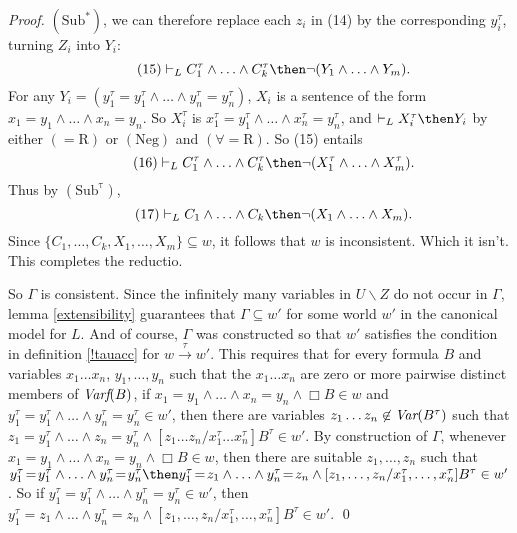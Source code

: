 \documentclass[11pt]{woarticle}
\theoremstyle{break}
\theoremstyle{nonumberplain}
\newcommand{\1}{\;\,|\;\,}
\newcommand{\var}{\emph{Var}}
\newcommand{\fvar}{\emph{Varf}}
\newcommand{\T}[1]{\ensuremath{(\mathrm{ #1})}}
\begin{document}
\begin{proof}
  \T{Sub^*}, we can therefore replace each $z_i$ in (14) by the
  corresponding $y_i^\tau$, turning $Z_i$ into $Y_i$:
  \begin{equation}\tag{15}
   \vdash_L C_1^\tau \land \ldots \land C_k^\tau \then \neg 
   (Y_1 \land\ldots\land Y_m).
  \end{equation}
  For any $Y_i = (y_1^\tau\!=\!y_1^\tau \land \ldots \land
  y_n^\tau\!=\!y_n^\tau)$, $X_i$ is a sentence of the form
  $x_1\!=\!y_1 \land \ldots \land x_n\!=\!y_n$. So $X_i^\tau$ is
  $x_1^\tau\!=\!y_1^\tau \land \ldots \land x_n^\tau\!=\!y_n^\tau$,
  and $\vdash_L X_i^\tau \then Y_i$ by either \T{=\!R} or \T{Neg} and
  \T{\forall\!=\!R}. So (15) entails
  \begin{equation}\tag{16}
    \vdash_L C_1^\tau \land \ldots \land C_k^\tau \then \neg 
    (X_1^\tau \land\ldots\land X_m^\tau).
  \end{equation}
  Thus by \T{Sub^\tau}, 
  \begin{equation}\tag{17}
    \vdash_L C_1 \land \ldots \land C_k \then \neg 
    (X_1 \land\ldots\land X_m).
  \end{equation}
  Since $\{ C_1,\ldots,C_k, X_1,\ldots,X_m \} \subseteq w$, it follows
  that $w$ is inconsistent. Which it isn't. This completes the
  reductio. 

  So $\Gamma$ is consistent. Since the infinitely many variables in
  $U\backslash Z$ do not occur in $\Gamma$, lemma \ref{extensibility}
  guarantees that $\Gamma \subseteq w'$ for some world $w'$ in the
  canonical model for $L$. And of course, $\Gamma$ was constructed so
  that $w'$ satisfies the condition in definition \ref{!tauacc} for
  $w\xrightarrow{\tau}w'$. This requires that for every formula $B$
  and variables $x_1\ldots x_n$, $y_1,\ldots,y_n$ such that the
  $x_1\ldots x_n$ are zero or more pairwise distinct members of
  $\fvar(B)$, if $x_1\!=\!y_1 \land \ldots \land x_n\!=\!y_n \land
  \Box B\in w$ and $y_1^\tau \!=\!y_1^\tau \land\ldots\land
  y_n^\tau\!=\!y_n^\tau \in w'$, then there are variables $z_1\ldots
  z_n \not\in \var(B^\tau)$ such that $z_1\!=\!y_1^\tau \land \ldots
  \land z_n\!=\!y_n^\tau \land [z_1\ldots z_n/x_1^\tau\ldots x_n^\tau]
  B^\tau \in w'$. By construction of $\Gamma$, whenever $x_1\!=\!y_1
  \land \ldots \land x_n\!=\!y_n \land \Box B\in w$, then there are
  suitable $z_1,\ldots,z_n$ such that $y_1^\tau\!=\!y_1^\tau \land
  \ldots \land y_n^\tau\!=\!y_n^\tau \then y_1^\tau\!=\!z_1 \land
  \ldots \land y_n^\tau\!=\!z_n \land
  [z_1,\ldots,z_n/x_1^\tau,\ldots,x_n^\tau]B^\tau \in w'$. So if
  $y_1^\tau\!=\!y_1^\tau \land \ldots \land y_n^\tau\!=\!y_n^\tau \in
  w'$, then $y_1^\tau\!=\!z_1 \land \ldots \land y_n^\tau\!=\!z_n
  \land [z_1,\ldots,z_n/x_1^\tau,\ldots,x_n^\tau]B^\tau \in w'$. \qed
 
\end{proof}
\end{document}
